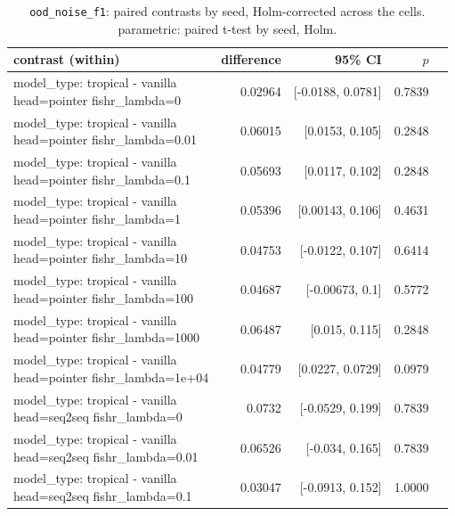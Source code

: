 \documentclass[10pt]{article}
\makeatletter
\newcommand{\stackcell}[1]{\begin{tabular}[t]{@{}l@{}}#1\end{tabular}}
\makeatother
\begin{document}
{\small
\begin{longtable}{lrrrl}
\caption{\texttt{ood\_noise\_f1}: paired contrasts by seed, Holm-corrected across the cells. parametric: paired t-test by seed, Holm.}\label{tab:paired-ood_noise_f1}\\
\toprule
contrast (within) & difference & 95\% CI & $p$ & \\
\midrule
\endhead
\stackcell{model\_type: tropical - vanilla\\\footnotesize head=pointer fishr\_lambda=0 } & 0.02964 & [-0.0188, 0.0781] & 0.7839 & \\
\stackcell{model\_type: tropical - vanilla\\\footnotesize head=pointer fishr\_lambda=0.01 } & 0.06015 & [0.0153, 0.105] & 0.2848 & \\
\stackcell{model\_type: tropical - vanilla\\\footnotesize head=pointer fishr\_lambda=0.1 } & 0.05693 & [0.0117, 0.102] & 0.2848 & \\
\stackcell{model\_type: tropical - vanilla\\\footnotesize head=pointer fishr\_lambda=1 } & 0.05396 & [0.00143, 0.106] & 0.4631 & \\
\stackcell{model\_type: tropical - vanilla\\\footnotesize head=pointer fishr\_lambda=10 } & 0.04753 & [-0.0122, 0.107] & 0.6414 & \\
\stackcell{model\_type: tropical - vanilla\\\footnotesize head=pointer fishr\_lambda=100 } & 0.04687 & [-0.00673, 0.1] & 0.5772 & \\
\stackcell{model\_type: tropical - vanilla\\\footnotesize head=pointer fishr\_lambda=1000 } & 0.06487 & [0.015, 0.115] & 0.2848 & \\
\stackcell{model\_type: tropical - vanilla\\\footnotesize head=pointer fishr\_lambda=1e+04 } & 0.04779 & [0.0227, 0.0729] & 0.0979 & \\
\stackcell{model\_type: tropical - vanilla\\\footnotesize head=seq2seq fishr\_lambda=0 } & 0.0732 & [-0.0529, 0.199] & 0.7839 & \\
\stackcell{model\_type: tropical - vanilla\\\footnotesize head=seq2seq fishr\_lambda=0.01 } & 0.06526 & [-0.034, 0.165] & 0.7839 & \\
\stackcell{model\_type: tropical - vanilla\\\footnotesize head=seq2seq fishr\_lambda=0.1 } & 0.03047 & [-0.0913, 0.152] & 1.0000 & \\

\end{longtable}}
\end{document}
